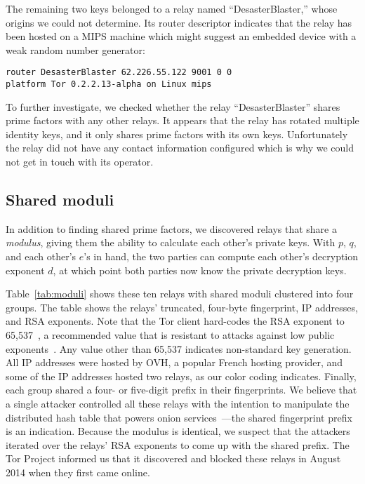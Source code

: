 The remaining two keys belonged to a relay named ``Desaster\-Blaster,'' whose
origins we could not determine. Its router descriptor indicates that the relay
has been hosted on a MIPS machine which might suggest an embedded device with a
weak random number generator:

{\footnotesize
\begin{verbatim}
router DesasterBlaster 62.226.55.122 9001 0 0
platform Tor 0.2.2.13-alpha on Linux mips
\end{verbatim}
}

To further investigate, we checked whether the relay ``Desaster\-Blaster'' shares
prime factors with any other relays. It appears that the relay has rotated
multiple identity keys, and it only shares prime factors with its own keys.
Unfortunately the relay did not have any contact information configured which is
why we could not get in touch with its operator.


\subsection{Shared moduli}
\label{sec:shared-moduli}
In addition to finding shared prime factors, we discovered relays that share a
\emph{modulus}, giving them the ability to calculate each other's private keys.
With $p$, $q$, and each other's $e$'s in hand, the two parties can compute
each other's decryption exponent $d$, at which point both parties now know the
private decryption keys.

Table~\ref{tab:moduli} shows these ten relays with shared moduli clustered into
four groups. The table shows the relays' truncated, four-byte fingerprint, IP
addresses, and RSA exponents.  Note that the Tor client hard-codes the RSA
exponent to 65,537~\cite[\S~0.3]{torspec}, a recommended value that is resistant
to attacks against low public exponents~\cite[\S~4]{Boneh1999a}.  Any value
other than 65,537 indicates non-standard key generation.  All IP addresses were
hosted by OVH, a popular French hosting provider, and some of the IP addresses
hosted two relays, as our color coding indicates.  Finally, each group shared a
four- or five-digit prefix in their fingerprints.  We believe that a single
attacker controlled all these relays with the intention to manipulate the
distributed hash table that powers onion services~\cite{Biryukov2013a}---the
shared fingerprint prefix is an indication.  Because the modulus is identical,
we suspect that the attackers iterated over the relays' RSA exponents to come up
with the shared prefix.  The Tor Project informed us that it discovered and
blocked these relays in August 2014 when they first came online.

